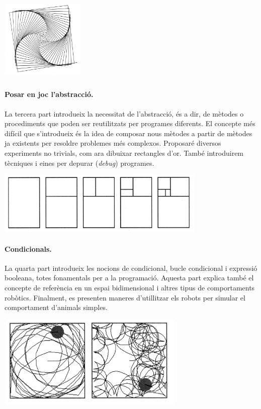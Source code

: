 \vspace{5mm}
\includegraphics[height=40mm ,width=40mm ]{Imatges/Preface2.jpg}

\paragraph{Posar en joc l'abstracció.} La tercera part introdueix la necessitat de l'abstracció, és a dir, de mètodes
o procediments que poden ser reutilitzats per programes diferents. El concepte 
més difícil que s'introdueix és la idea de composar nous mètodes a partir de mètodes
ja existents per resoldre problemes més complexos. Proposaré diversos 
experiments no trivials, com ara dibuixar rectangles d'or. També introduirem
tècniques i eines per depurar (\textit{debug}) programes.

\vspace{5mm}
\includegraphics[height=30mm ,width=100mm ]{Imatges/Preface3.jpg}

\paragraph{Condicionals.} La quarta part introdueix les nocions de condicional, bucle condicional i 
expressió booleana, totes fonamentals per a la programació. Aquesta part 
explica també el concepte de referència en un espai bidimensional i altres
tipus de comportaments robòtics. Finalment, es presenten maneres d'utillitzar
els robots per simular el comportament d'animals simples.

\vspace{5mm}
\includegraphics[height=45mm ,width=90mm ]{Imatges/Preface4.jpg}

